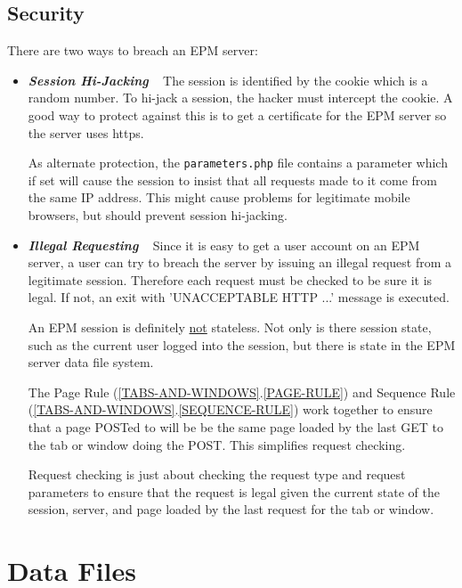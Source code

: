 \documentclass[12pt]{article}
\newcommand{\key}[1]{{\bf \em #1}}
\newcommand{\sref}[2]{(\ref{#1}.\ref{#2})}
\begin{document}
\subsection{Security}

There are two ways to breach an EPM server:

\begin{itemize}

\item \key{Session Hi-Jacking} ~ The session is identified
by the cookie which is a random number.  To hi-jack a session,
the hacker must intercept the cookie.  A good way to 
protect against this is to get a certificate for the EPM
server so the server uses https.

As alternate protection, the {\tt parameters.php} file
contains a parameter which if set will cause the session
to insist that all requests made to it come from the same
IP address.  This might cause problems for legitimate mobile browsers,
but should prevent session hi-jacking.

\item \key{Illegal Requesting} ~ Since it is easy to get a user
account on an EPM server, a user can try to breach the server by issuing
an illegal request from a legitimate session.  Therefore each
request must be checked to be sure it is legal.  If not,
an exit with 'UNACCEPTABLE HTTP ...' message is executed.

An EPM session is definitely \underline{not} stateless.
Not only is there session state, such as the current
user logged into the session, but there is state in the
EPM server data file system.

The Page Rule \sref{TABS-AND-WINDOWS}{PAGE-RULE}
and Sequence Rule \sref{TABS-AND-WINDOWS}{SEQUENCE-RULE}
work together to ensure that a page POSTed to will be
be the same page loaded by the last GET to the tab or
window doing the POST.  This simplifies request checking.

Request checking is just about checking the request type and
request parameters to ensure that the request is legal given the
current state of the session, server, and page loaded by the
last request for the tab or window.

\end{itemize}

\newpage

\section{Data Files}
\end{document}

